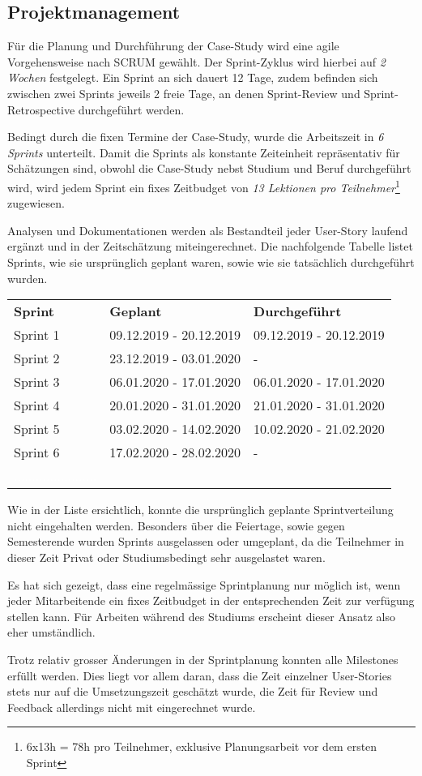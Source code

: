 \subsection{Projektmanagement}
Für die Planung und Durchführung der Case-Study wird eine agile Vorgehensweise nach SCRUM gewählt. Der Sprint-Zyklus wird hierbei auf \emph{2 Wochen} festgelegt. Ein Sprint an sich dauert 12 Tage, zudem befinden sich zwischen zwei Sprints jeweils 2 freie Tage, an denen Sprint-Review und Sprint-Retrospective durchgeführt werden.

Bedingt durch die fixen Termine der Case-Study, wurde die Arbeitszeit in \emph{6 Sprints} unterteilt. Damit die Sprints als konstante Zeiteinheit repräsentativ für Schätzungen sind, obwohl die Case-Study nebst Studium und Beruf durchgeführt wird, wird jedem Sprint ein fixes Zeitbudget von \emph{13 Lektionen pro Teilnehmer}\footnote{6x13h = 78h pro Teilnehmer, exklusive Planungsarbeit vor dem ersten Sprint} zugewiesen.

Analysen und Dokumentationen werden als Bestandteil jeder User-Story laufend ergänzt und in der Zeitschätzung miteingerechnet. Die nachfolgende Tabelle listet Sprints, wie sie ursprünglich geplant waren, sowie wie sie tatsächlich durchgeführt wurden.

\begin{center}
  \begin{tabular}{ l l l }
    \textbf{Sprint} & \textbf{Geplant} & \textbf{Durchgeführt} \\
    Sprint 1 & 09.12.2019 - 20.12.2019 & 09.12.2019 - 20.12.2019 \\
    Sprint 2 & 23.12.2019 - 03.01.2020 & - \\
    Sprint 3 & 06.01.2020 - 17.01.2020 & 06.01.2020 - 17.01.2020 \\
    Sprint 4 & 20.01.2020 - 31.01.2020 & 21.01.2020 - 31.01.2020 \\
    Sprint 5 & 03.02.2020 - 14.02.2020 & 10.02.2020 - 21.02.2020 \\
    Sprint 6 & 17.02.2020 - 28.02.2020 & - \\
    \textcolor{white}{.......................} &&\\
  \end{tabular}
\end{center}

\noindent
Wie in der Liste ersichtlich, konnte die ursprünglich geplante Sprintverteilung nicht eingehalten werden. Besonders über die Feiertage, sowie gegen Semesterende wurden Sprints ausgelassen oder umgeplant, da die Teilnehmer in dieser Zeit Privat oder Studiumsbedingt sehr ausgelastet waren.

Es hat sich gezeigt, dass eine regelmässige Sprintplanung nur möglich ist, wenn jeder Mitarbeitende ein fixes Zeitbudget in der entsprechenden Zeit zur verfügung stellen kann. Für Arbeiten während des Studiums erscheint dieser Ansatz also eher umständlich.

Trotz relativ grosser Änderungen in der Sprintplanung konnten alle Milestones erfüllt werden. Dies liegt vor allem daran, dass die Zeit einzelner User-Stories stets nur auf die Umsetzungszeit geschätzt wurde, die Zeit für Review und Feedback allerdings nicht mit eingerechnet wurde.
